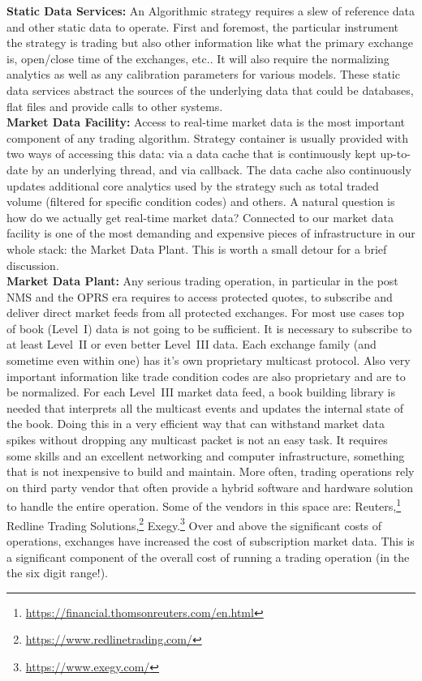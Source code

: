 \noindent\textbf{Static Data Services:} An Algorithmic strategy requires a slew of reference data and other static data to operate. First and foremost, the particular instrument the strategy is trading but also other information like what the primary exchange is, open/close time of the exchanges, etc.. It will also require the normalizing analytics as well as any calibration parameters for various models. These static data services abstract the sources of the underlying data that could be databases, flat files and provide calls to other systems. \\


\noindent\textbf{Market Data Facility:} Access to real-time market data is the most important component of any trading algorithm. Strategy container is usually provided with two ways of accessing this data: via a data cache that is continuously kept up-to-date by an underlying thread, and via callback. The data cache also continuously updates additional core analytics used by the strategy such as total traded volume (filtered for specific condition codes) and others. A natural question is how do we actually get real-time market data? Connected to our market data facility is one of the most demanding and expensive pieces of infrastructure in our whole stack: the Market Data Plant. This is worth a small detour for a brief discussion. \\


\noindent\textbf{Market Data Plant:}  Any serious trading operation, in particular in the post NMS and the OPRS era requires to access protected quotes, to subscribe and deliver direct market feeds from all protected exchanges. For most use cases top of book (Level~I) data is not going to be sufficient. It is necessary to subscribe to at least Level~II or even better Level~III data. Each exchange family (and sometime even within one) has it's own proprietary multicast protocol. Also very important information like trade condition codes are also proprietary and are to be normalized. For each Level~III market data feed, a book building library is needed that interprets all the multicast events and updates the internal state of the book. Doing this in a very efficient way that can withstand market data spikes without dropping any multicast packet is not an easy task. It requires some skills and an excellent networking and computer infrastructure, something that is not inexpensive to build and maintain. More often, trading operations rely on third party vendor that often provide a hybrid software and hardware solution to handle the entire operation. Some of the vendors in this space are: Reuters,\footnote{\url{https://financial.thomsonreuters.com/en.html}} Redline Trading Solutions,\footnote{\url{https://www.redlinetrading.com/}} Exegy.\footnote{\url{https://www.exegy.com/}} Over and above the significant costs of operations, exchanges have increased the cost of subscription market data. This is a significant component of the overall cost of running a trading operation (in the the six digit range!). \\


